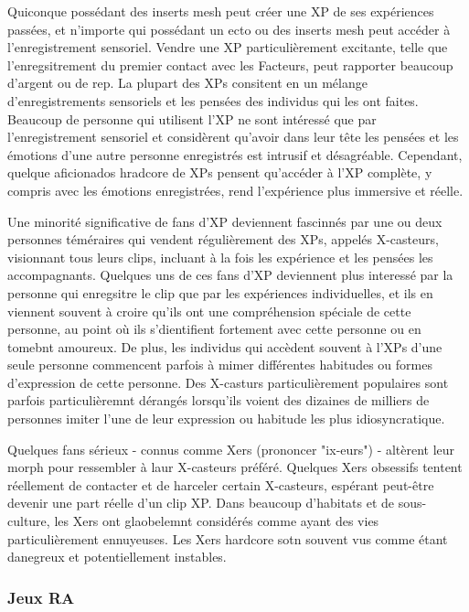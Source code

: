                Quiconque possédant des inserts mesh peut créer une XP de ses expériences passées, et n'importe qui possédant un ecto ou des inserts mesh peut accéder à l'enregistrement sensoriel. Vendre une XP particulièrement excitante, telle que l'enregsitrement du premier contact avec les Facteurs, peut rapporter beaucoup d'argent ou de rep. La plupart des XPs consitent en un mélange d'enregistrements sensoriels et les pensées des individus qui les ont faites. Beaucoup de personne qui utilisent l'XP ne sont intéressé que par l'enregistrement sensoriel et considèrent qu'avoir dans leur tête les pensées et les émotions d'une autre personne enregistrés est intrusif et désagréable. Cependant, quelque aficionados hradcore de XPs pensent qu'accéder à l'XP complète, y compris avec les émotions enregistrées, rend l'expérience plus immersive et réelle. 

               Une minorité significative de fans d'XP deviennent fascinnés par une ou deux personnes téméraires qui vendent régulièrement des XPs, appelés X-casteurs, visionnant tous leurs clips, incluant à la fois les expérience et les pensées les accompagnants. Quelques uns de ces fans d'XP deviennent plus interessé par la personne qui enregsitre le clip que par les expériences individuelles, et ils en viennent souvent à croire qu'ils ont une compréhension spéciale de cette personne, au point où ils s'dientifient fortement avec cette personne ou en tomebnt amoureux. De plus, les individus qui accèdent souvent à l'XPs d'une seule personne commencent parfois à mimer différentes habitudes ou formes d'expression de cette personne. Des X-casturs particulièrement populaires sont parfois particulièremnt dérangés lorsqu'ils voient des dizaines de milliers de personnes imiter l'une de leur expression ou habitude les plus idiosyncratique. 

               Quelques fans sérieux - connus comme Xers (prononcer "ix-eurs") - altèrent leur morph pour ressembler à laur X-casteurs préféré. Quelques Xers obsessifs tentent réellement de contacter et de harceler certain X-casteurs, espérant peut-être devenir une part réelle d'un clip XP. Dans beaucoup d'habitats et de sous-culture, les Xers ont glaobelemnt considérés comme ayant des vies particulièrement ennuyeuses. Les Xers hardcore sotn souvent vus comme étant danegreux et potentiellement instables. 

               \subsubsection{Jeux RA} \label{sec:ar-games} 

